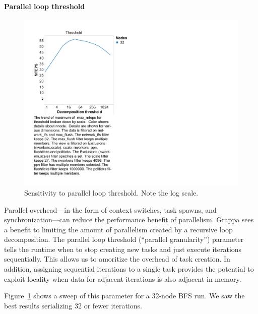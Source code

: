 


\paragraph{Parallel loop threshold}

\begin{figure}[htb]
\begin{center}
  \includegraphics[width=0.95\columnwidth]{figs/bfs_sweep_threshold}
\begin{minipage}{0.95\columnwidth}
  \caption{\label{fig:bfs-sweep-threshold} Sensitivity to parallel loop threshold. Note the log scale.}
\end{minipage}
\vspace{-3ex}
\end{center}
\end{figure}

Parallel overhead---in the form of context switches, task spawns, and
synchronization---can reduce the performance benefit of parallelism.
Grappa sees a benefit to limiting the amount of parallelism created by
a recursive loop decomposition. The parallel loop threshold (``parallel
granularity'') parameter tells the runtime when to stop creating new tasks and just execute iterations
sequentially. This allows us to amoritize the overhead of task
creation. In addition, assigning sequential iterations to a single
task provides the potential to exploit locality when data for adjacent iterations is
also adjacent in memory.

Figure~\ref{fig:bfs-sweep-threshold} shows a sweep of this parameter
for a 32-node BFS run. We saw the best results serializing 32 or fewer
iterations.

